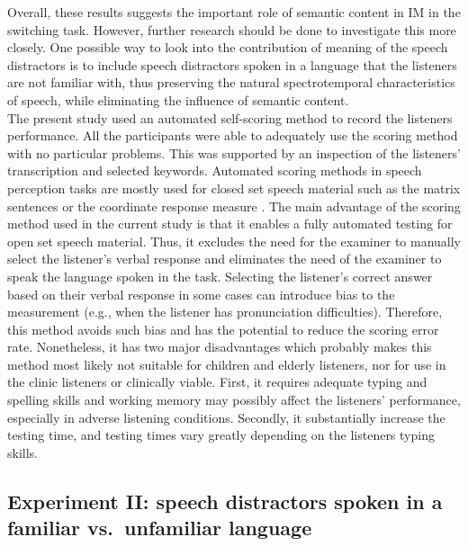 \documentclass[a4paper, twoside]{templates/ociamthesis}
\begin{document}
Overall, these results suggests the important role of semantic content in IM in the switching task. However, further research should be done to investigate this more closely. One possible way to look into the contribution of meaning of the speech distractors is to include speech distractors spoken in a language that the listeners are not familiar with, thus preserving the natural spectrotemporal characteristics of speech, while eliminating the influence of semantic content.\\

The present study used an automated self-scoring method to record the listeners performance. All the participants were able to adequately use the scoring method with no particular problems. This was supported by an inspection of the listeners' transcription and selected keywords. Automated scoring methods in speech perception tasks are mostly used for closed set speech material such as the matrix sentences \autocite{Kollmeier2015} or the coordinate response measure \autocite[CRM;][]{Bolia2000}. The main advantage of the scoring method used in the current study is that it enables a fully automated testing for open set speech material. Thus, it excludes the need for the examiner to manually select the listener's verbal response and eliminates the need of the examiner to speak the language spoken in the task. Selecting the listener's correct answer based on their verbal response in some cases can introduce bias to the measurement (e.g., when the listener has pronunciation difficulties). Therefore, this method avoids such bias and has the potential to reduce the scoring error rate. Nonetheless, it has two major disadvantages which probably makes this method most likely not suitable for children and elderly listeners, nor for use in the clinic listeners or clinically viable. First, it requires adequate typing and spelling skills and working memory may possibly affect the listeners' performance, especially in adverse listening conditions. Secondly, it substantially increase the testing time, and testing times vary greatly depending on the listeners typing skills.\\

\hypertarget{experiment-ii-speech-distractors-spoken-in-a-familiar-vs.-unfamiliar-language}{%
\subsection{Experiment II: speech distractors spoken in a familiar vs.~unfamiliar language}\label{experiment-ii-speech-distractors-spoken-in-a-familiar-vs.-unfamiliar-language}}
\end{document}
